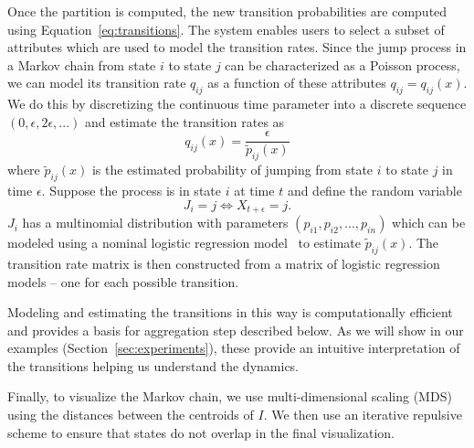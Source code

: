 

Once the partition is computed, the new transition probabilities are computed using Equation~\ref{eq:transitions}.
%
The system enables users to select a subset of attributes which are used to model the transition rates. Since the
jump process in a Markov chain from state $i$ to state $j$ can be characterized as a Poisson process, we can model its
transition rate $q_{ij}$ as a function of these attributes $q_{ij} = q_{ij}(x)$. We do this by discretizing the continuous time parameter into a discrete sequence $(0, \epsilon, 2\epsilon, ...)$ and
estimate the transition rates as
\begin{equation}
	\label{eq:transitions}
	q_{ij}(x) = \frac{\epsilon}{\tilde{p}_{ij}(x)}
\end{equation}
where $\tilde{p}_{ij}(x)$ is the estimated probability of jumping from state $i$ to state $j$ in time
$\epsilon$.
%
Suppose the process is in state $i$ at time $t$ and define the random variable 
$$J_i = j \Leftrightarrow X_{t + \epsilon} = j.$$
$J_i$  has a multinomial distribution with parameters $(p_{i1}, p_{i2}, ..., p_{in})$ which can be 
modeled using a nominal logistic regression model~\cite{glm-introduction} to estimate $\tilde{p}_{ij}(x)$.
The transition rate matrix is then constructed from a matrix of logistic regression models -- one for each possible transition. 

Modeling and estimating the transitions in this way is computationally efficient and provides a basis for aggregation step described below. As we will show in our examples (Section~\ref{sec:experiments}), these provide an intuitive interpretation of the transitions helping us understand the dynamics. 	

Finally, to visualize the Markov chain, we use multi-dimensional scaling (MDS) \cite{cox2000multidimensional} using the distances between the centroids of $I$. 
We then use an iterative repulsive scheme to ensure that states %
do not overlap in the final visualization.

